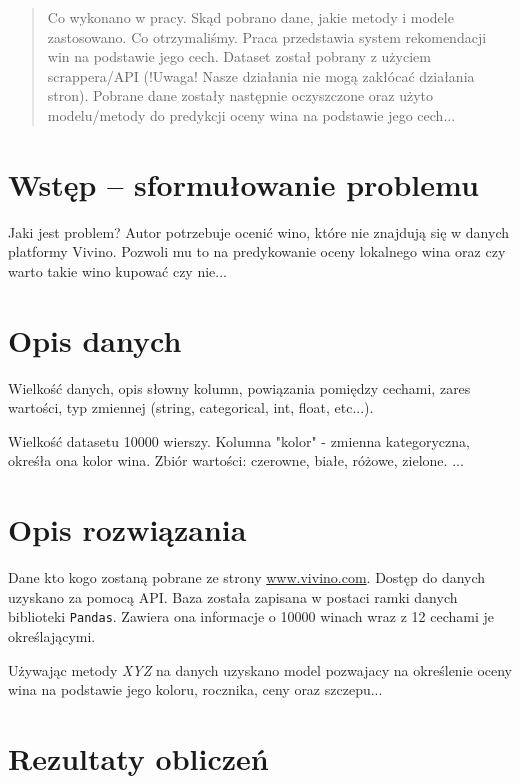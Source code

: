 \documentclass[10pt]{article}
\begin{document}


\begin{abstract}
Co wykonano w pracy. Skąd pobrano dane, jakie metody i modele zastosowano. Co otrzymaliśmy.
Praca przedstawia system rekomendacji win na podstawie jego cech. Dataset został pobrany z użyciem scrappera/API (!Uwaga! Nasze działania nie mogą zakłócać działania stron). Pobrane dane zostały następnie oczyszczone oraz użyto modelu/metody do predykcji oceny wina na podstawie jego cech...

\end{abstract}

\section{Wstęp -- sformułowanie problemu}
\label{sec:wstep}

Jaki jest problem?
Autor potrzebuje ocenić wino, które nie znajdują się w danych platformy Vivino. Pozwoli mu to na predykowanie oceny lokalnego wina oraz czy warto takie wino kupować czy nie...

\section{Opis danych}
Wielkość danych, opis słowny kolumn, powiązania pomiędzy cechami, zares wartości, typ zmiennej (string, categorical, int, float, etc...).

Wielkość datasetu 10000 wierszy.
Kolumna "kolor" - zmienna kategoryczna, okreśła ona kolor wina. Zbiór wartości: czerowne, białe, różowe, zielone.
...


\section{Opis rozwiązania}

Dane kto kogo zostaną pobrane ze strony \url{www.vivino.com}. Dostęp do danych uzyskano za pomocą API. Baza została zapisana w postaci ramki danych biblioteki \texttt{Pandas}. Zawiera ona informacje o 10000 winach wraz z 12 cechami je określającymi.

Używając metody \textit{XYZ} na danych uzyskano model pozwajacy na określenie oceny wina na podstawie jego koloru, rocznika, ceny oraz szczepu...

\section{Rezultaty obliczeń}
\end{document}
